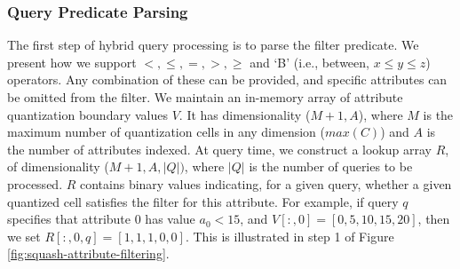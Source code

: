 \subsubsection{Query Predicate Parsing}
The first step of hybrid query processing is to parse the filter predicate. We present how we support $<, \leq, =, >, \geq$ and `B' (i.e., between, $x \leq y \leq z$) operators. Any combination of these can be provided, and specific attributes can be omitted from the filter. 
We maintain an in-memory array of attribute quantization boundary values $V$. 
It has dimensionality ($M + 1, A$), where $M$ is the maximum number of quantization cells in any dimension ($max(C)$) and $A$ is the number of attributes indexed.
At query time, we construct a lookup array $R$, of dimensionality ($M+1, A, |Q|)$, where $|Q|$ is the number of queries to be processed. $R$ contains binary values indicating, for a given query, whether a given quantized cell satisfies the filter for this attribute. %
For example, if query $q$ specifies that attribute 0 has value $a_0 < 15$, and $V[:,0] = [0, 5, 10, 15, 20]$, then we set $R[:,0,q] = [1, 1, 1, 0, 0]$. This is illustrated in step 1 of Figure \ref{fig:squash-attribute-filtering}.

